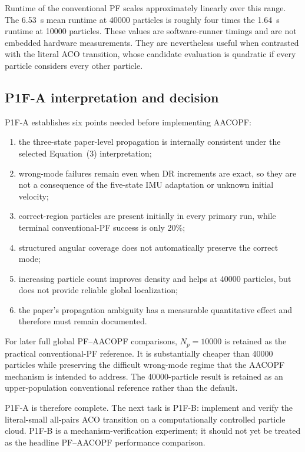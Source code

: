 Runtime of the conventional PF scales approximately linearly over this range. The \SI{6.53}{s} mean runtime at 40000 particles is roughly four times the \SI{1.64}{s} runtime at 10000 particles. These values are software-runner timings and are not embedded hardware measurements. They are nevertheless useful when contrasted with the literal ACO transition, whose candidate evaluation is quadratic if every particle considers every other particle.

\subsection{P1F-A interpretation and decision}
P1F-A establishes six points needed before implementing AACOPF:
\begin{enumerate}
    \item the three-state paper-level propagation is internally consistent under the selected Equation~(3) interpretation;
    \item wrong-mode failures remain even when DR increments are exact, so they are not a consequence of the five-state IMU adaptation or unknown initial velocity;
    \item correct-region particles are present initially in every primary run, while terminal conventional-PF success is only 20\%;
    \item structured angular coverage does not automatically preserve the correct mode;
    \item increasing particle count improves density and helps at 40000 particles, but does not provide reliable global localization;
    \item the paper's propagation ambiguity has a measurable quantitative effect and therefore must remain documented.
\end{enumerate}

For later full global PF--AACOPF comparisons, $N_p=10000$ is retained as the practical conventional-PF reference. It is substantially cheaper than 40000 particles while preserving the difficult wrong-mode regime that the AACOPF mechanism is intended to address. The 40000-particle result is retained as an upper-population conventional reference rather than the default.

P1F-A is therefore complete. The next task is P1F-B: implement and verify the literal-small all-pairs ACO transition on a computationally controlled particle cloud. P1F-B is a mechanism-verification experiment; it should not yet be treated as the headline PF--AACOPF performance comparison.


